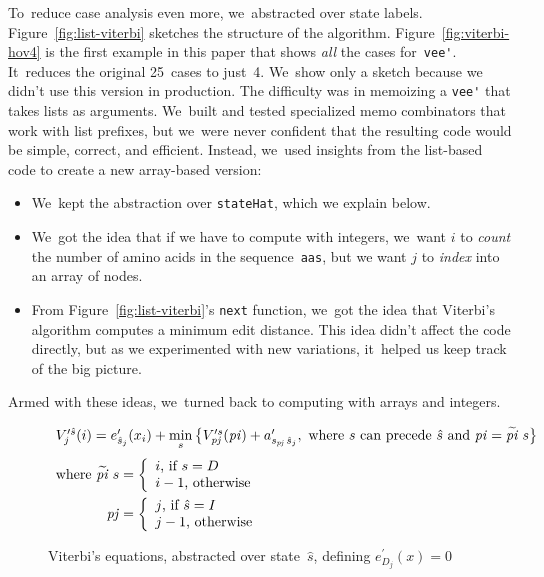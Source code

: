 \documentclass[]{jfp1}
\newcommand\figref[1]{Figure~\ref{fig:#1}}
\newcommand\figlabel[1]{\label{fig:#1}}
\begin{document}
To~reduce case analysis even more, we~abstracted over state labels.
\figref{list-viterbi} sketches the structure of the algorithm.
\figref{viterbi-hov4} is the first example in this paper that
shows \emph{all} the cases for~\verb+vee'+.
It~reduces the original 25~cases to just~4.
We~show only a sketch because we didn't use this version in
production.
The difficulty was in memoizing a \verb+vee'+ that takes lists as
arguments. 
We~built and tested specialized memo combinators that work
with list prefixes, but 
we~were never confident that the resulting code would be simple,
correct, and efficient.
Instead, we~used insights from the list-based code to create a new
array-based version:
\begin{itemize}
\item
We~kept the abstraction over \texttt{stateHat}, which we explain
below.
\item
We~got the idea that if we have to compute with integers, we~want
$i$ to \emph{count} the number
of amino acids in the sequence~\texttt{aas}, 
but we want $j$ to \emph{index} into an array of nodes.
\item
From
\figref{list-viterbi}'s \texttt{next} function, we~got the idea that
Viterbi's algorithm 
computes a minimum edit 
distance.
This idea didn't affect the code directly, but as we experimented with
new variations, it~helped us keep track of the big picture.
\end{itemize}
Armed with these ideas, we~turned back to computing with arrays and
integers. 


\def\p#1{\mathit{p#1}}
\begin{figure}
\def\vsum#1#2{#1+#2}
\[
\begin{array}{r@{}c@{}l}
\multicolumn3{c}{
  V_{j}^{\prime \hat s}(i) = e^{\prime}_{\hat s_{j}}(x_{i}) 
    + \min\limits_s \big\{
         \vsum{V_{\mathit{\p j}}^{\prime s}(\p i)} 
     {a^{\prime}_{s_{\p j} \,\hat s_j}}, 
      \mbox{ where $s$ can precede $\hat s$ and $\p i = \widetilde{\p i}\; s$}  \big\}
}
\\[10pt]
\mbox{where }\widetilde{\p i}\; s&{} = {}& 
  \left\{ \begin{array}{l}
          i \mbox{, if $s=D$}\\
          i-1 \mbox{, otherwise}\\
          \end{array}
  \right.
\\[10pt]
\p j &{} = {}& 
  \left\{ \begin{array}{l}
          j \mbox{, if $\hat s=I$}\\
          j-1 \mbox{, otherwise}\\
          \end{array}
  \right.
\\
\end{array}
\]

\caption{Viterbi's equations, abstracted over state~$\hat s$, 
defining $e^{\prime}_{D_j}(x) = 0$}
\figlabel{viterbi-abstracted}
\end{figure}
\end{document}
